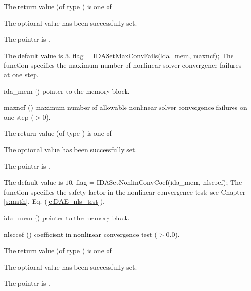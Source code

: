 {{\begin{args}
  \end{args}
}
{
  The return value  (of type ) is one of
  \begin{args}
  \item[\Id{IDA\_SUCCESS}] 
    The optional value has been successfully set.
  \item[\Id{IDA\_MEM\_NULL}]
    The  pointer is .
  \end{args}
}
{
  The default value is $3$.
}
{
flag = IDASetMaxConvFails(ida\_mem, maxncf);
}
{
  The function  specifies the
  maximum number of nonlinear solver convergence failures at one step.
}
{
  \begin{args}
  \item[ida\_mem] ()
    pointer to the {\ida} memory block.
  \item[maxncf] ()
    maximum number of allowable nonlinear solver convergence failures
    on one step ($>0$).
  \end{args}
}
{
  The return value  (of type ) is one of
  \begin{args}
  \item[\Id{IDA\_SUCCESS}] 
    The optional value has been successfully set.
  \item[\Id{IDA\_MEM\_NULL}]
    The  pointer is .
  \end{args}
}
{
  The default value is $10$.
}
{
flag = IDASetNonlinConvCoef(ida\_mem, nlscoef);
}
{
  The function  specifies the safety factor
  in the nonlinear convergence test;
  see Chapter \ref{s:math}, Eq. (\ref{e:DAE_nls_test}).
}
{
  \begin{args}
  \item[ida\_mem] ()
    pointer to the {\ida} memory block.
  \item[nlscoef] ()
    coefficient in nonlinear convergence test ($>0.0$).
  \end{args}
}
{
  The return value  (of type ) is one of
  \begin{args}
  \item[\Id{IDA\_SUCCESS}] 
    The optional value has been successfully set.
  \item[\Id{IDA\_MEM\_NULL}]
    The  pointer is .
  \item[\Id{IDA\_ILL\_INPUT}]

\end{args}}}
